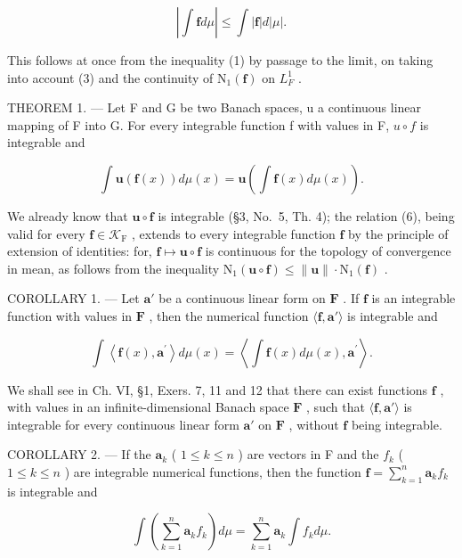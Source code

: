 \[
\left| \int \mathbf {f} d \mu \right| \leqslant \int | \mathbf {f} | d | \mu |.\tag{5}
\]

This follows at once from the inequality (1) by passage to the limit, on taking into account (3) and the continuity of \(\mathrm{N}_{1}(\mathbf{f})\) on \(L_{F}^{1}\) .

THEOREM 1. --- Let F and G be two Banach spaces, u a continuous linear mapping of F into G. For every integrable function f with values in F, \(u \circ f\) is integrable and

\[
\int \mathbf {u} (\mathbf {f} (x)) d \mu (x) = \mathbf {u} \left(\int \mathbf {f} (x) d \mu (x)\right).\tag{6}
\]

We already know that \(\mathbf{u} \circ \mathbf{f}\) is integrable (§3, No.~5, Th. 4); the relation (6), being valid for every \(\mathbf{f} \in \mathcal{K}_{\mathrm{F}}\) , extends to every integrable function \(\mathbf{f}\) by the principle of extension of identities: for, \(\mathbf{f} \mapsto \mathbf{u} \circ \mathbf{f}\) is continuous for the topology of convergence in mean, as follows from the inequality \(\mathrm{N}_1(\mathbf{u} \circ \mathbf{f}) \leqslant \| \mathbf{u} \| \cdot \mathrm{N}_1(\mathbf{f})\) .

COROLLARY 1. --- Let \(\mathbf{a}'\) be a continuous linear form on \(\mathbf{F}\) . If \(\mathbf{f}\) is an integrable function with values in \(\mathbf{F}\) , then the numerical function \(\langle \mathbf{f}, \mathbf{a}' \rangle\) is integrable and

\[
\int \left\langle \mathbf {f} (x), \mathbf {a} ^ {\prime} \right\rangle d \mu (x) = \left\langle \int \mathbf {f} (x) d \mu (x), \mathbf {a} ^ {\prime} \right\rangle .\tag{7}
\]

We shall see in Ch. VI, §1, Exers. 7, 11 and 12 that there can exist functions \(\mathbf{f}\) , with values in an infinite-dimensional Banach space \(\mathbf{F}\) , such that \(\langle \mathbf{f}, \mathbf{a}' \rangle\) is integrable for every continuous linear form \(\mathbf{a}'\) on \(\mathbf{F}\) , without \(\mathbf{f}\) being integrable.

COROLLARY 2. --- If the \(\mathbf{a}_k\) ( \(1 \leqslant k \leqslant n\) ) are vectors in F and the \(f_k\) ( \(1 \leqslant k \leqslant n\) ) are integrable numerical functions, then the function \(\mathbf{f} = \sum_{k=1}^{n} \mathbf{a}_k f_k\) is integrable and

\[
\int \left(\sum_ {k = 1} ^ {n} \mathbf {a} _ {k} f _ {k}\right) d \mu = \sum_ {k = 1} ^ {n} \mathbf {a} _ {k} \int f _ {k} d \mu .\tag{8}
\]

